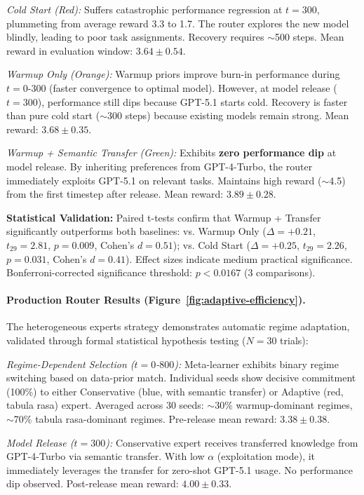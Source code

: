 \textit{Cold Start (Red):} Suffers catastrophic performance regression at $t=300$, plummeting from average reward 3.3 to 1.7. The router explores the new model blindly, leading to poor task assignments. Recovery requires $\sim$500 steps. Mean reward in evaluation window: $3.64 \pm 0.54$.

\textit{Warmup Only (Orange):} Warmup priors improve burn-in performance during $t=0$-$300$ (faster convergence to optimal model). However, at model release ($t=300$), performance still dips because GPT-5.1 starts cold. Recovery is faster than pure cold start ($\sim$300 steps) because existing models remain strong. Mean reward: $3.68 \pm 0.35$.

\textit{Warmup + Semantic Transfer (Green):} Exhibits \textbf{zero performance dip} at model release. By inheriting preferences from GPT-4-Turbo, the router immediately exploits GPT-5.1 on relevant tasks. Maintains high reward ($\sim$4.5) from the first timestep after release. Mean reward: $3.89 \pm 0.28$. 

\textbf{Statistical Validation:} Paired t-tests confirm that Warmup + Transfer significantly outperforms both baselines: vs. Warmup Only ($\Delta = +0.21$, $t_{29} = 2.81$, $p = 0.009$, Cohen's $d = 0.51$); vs. Cold Start ($\Delta = +0.25$, $t_{29} = 2.26$, $p = 0.031$, Cohen's $d = 0.41$). Effect sizes indicate medium practical significance. Bonferroni-corrected significance threshold: $p < 0.0167$ (3 comparisons).

\paragraph{Production Router Results (Figure~\ref{fig:adaptive-efficiency}).} 
The heterogeneous experts strategy demonstrates automatic regime adaptation, validated through formal statistical hypothesis testing ($N=30$ trials):

\textit{Regime-Dependent Selection ($t=0$-$800$):} Meta-learner exhibits binary regime switching based on data-prior match. Individual seeds show decisive commitment (100\%) to either Conservative (blue, with semantic transfer) or Adaptive (red, tabula rasa) expert. Averaged across 30 seeds: $\sim$30\% warmup-dominant regimes, $\sim$70\% tabula rasa-dominant regimes. Pre-release mean reward: $3.38 \pm 0.38$.

\textit{Model Release ($t=300$):} Conservative expert receives transferred knowledge from GPT-4-Turbo via semantic transfer. With low $\alpha$ (exploitation mode), it immediately leverages the transfer for zero-shot GPT-5.1 usage. No performance dip observed. Post-release mean reward: $4.00 \pm 0.33$.

